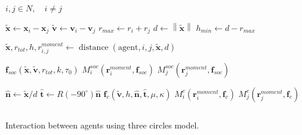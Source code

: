 \begin{algorithm}[H]
\begin{algorithmic}[1]
\REQUIRE $ i,j \in N, \quad i \neq j $
\ENSURE

\STATE $ \tilde{\mathbf{x}} \gets \mathbf{x}_{i} - \mathbf{x}_{j} $
\STATE $ \tilde{\mathbf{v}} \gets \mathbf{v}_{i} - \mathbf{v}_{j} $
\STATE $ r_{max} \gets r_{i} + r_{j} $ 
\STATE $ d \gets \left\|\tilde{\mathbf{x}}\right\| $
\STATE $ h_{min} \gets d - r_{max} $
\STATE 

\STATE $ \tilde{\mathbf{x}}, r_{tot}, h, r_{i,j}^{moment} \gets \operatorname{distance}(\mathrm{agent}, i, j, \tilde{\mathbf{x}}, d) $
\STATE

\STATE $ \mathbf{f}_{soc}(\tilde{\mathbf{x}}, \tilde{\mathbf{v}}, r_{tot}, k, \tau_{0}) $
\STATE $ M_{i}^{soc}(\mathbf{r}_{i}^{moment}, \mathbf{f}_{soc}) $
\STATE $ M_{j}^{soc}(\mathbf{r}_{j}^{moment}, \mathbf{f}_{soc}) $

\STATE

\STATE $ \hat{\mathbf{n}} \gets \tilde{\mathbf{x}} / d $
\STATE $ \hat{\mathbf{t}} \gets R(-90^{\circ}) \hat{\mathbf{n}} $
\STATE $ \mathbf{f}_{c}(\tilde{\mathbf{v}}, h, \hat{\mathbf{n}}, \hat{\mathbf{t}}, \mu, \kappa) $
\STATE $ M_{i}^{c}(\mathbf{r}_{i}^{moment}, \mathbf{f}_{c}) $
\STATE $ M_{j}^{c}(\mathbf{r}_{j}^{moment}, \mathbf{f}_{c}) $
\ENDIF
\ENDIF

\ENDIF
\STATE $  $
\end{algorithmic}
\caption{Interaction between agents using three circles model.}
\end{algorithm}

